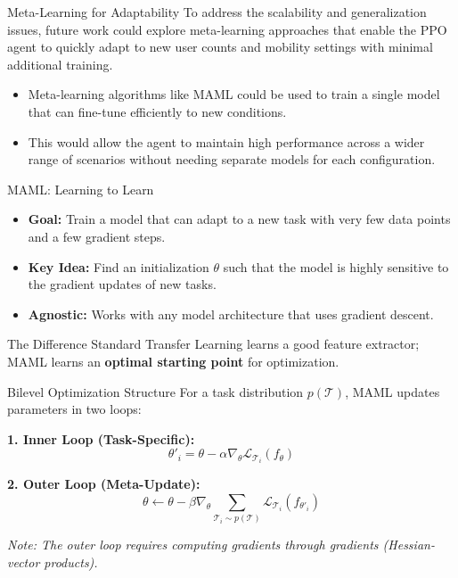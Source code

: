 \documentclass[aspectratio=169]{beamer}
\begin{document}
\begin{frame}{Meta-Learning for Adaptability}
  To address the scalability and generalization issues, future work could explore meta-learning approaches that enable the PPO agent to quickly adapt to new user counts and mobility settings with minimal additional training.

  \begin{itemize}
    \item Meta-learning algorithms like MAML could be used to train a single model that can fine-tune efficiently to new conditions.
    \item This would allow the agent to maintain high performance across a wider range of scenarios without needing separate models for each configuration.
  \end{itemize}

\end{frame}

\begin{frame}{MAML: Learning to Learn}
    \begin{itemize}
        \item \textbf{Goal:} Train a model that can adapt to a new task with very few data points and a few gradient steps.
        \item \textbf{Key Idea:} Find an initialization $\theta$ such that the model is highly sensitive to the gradient updates of new tasks.
        \item \textbf{Agnostic:} Works with any model architecture that uses gradient descent.
    \end{itemize}
    \begin{block}{The Difference}
        Standard Transfer Learning learns a good feature extractor; MAML learns an \textbf{optimal starting point} for optimization.
    \end{block}
\end{frame}

\begin{frame}{Bilevel Optimization Structure}
    For a task distribution $p(\mathcal{T})$, MAML updates parameters in two loops:
    
    \vspace{0.5cm}
    \textbf{1. Inner Loop (Task-Specific):}
    \begin{equation}
        \theta'_i = \theta - \alpha \nabla_\theta \mathcal{L}_{\mathcal{T}_i}(f_\theta)
    \end{equation}
    
    \textbf{2. Outer Loop (Meta-Update):}
    \begin{equation}
        \theta \leftarrow \theta - \beta \nabla_\theta \sum_{\mathcal{T}_i \sim p(\mathcal{T})} \mathcal{L}_{\mathcal{T}_i}(f_{\theta'_i})
    \end{equation}
    
    \textit{Note: The outer loop requires computing gradients through gradients (Hessian-vector products).}
\end{frame}
\end{document}
